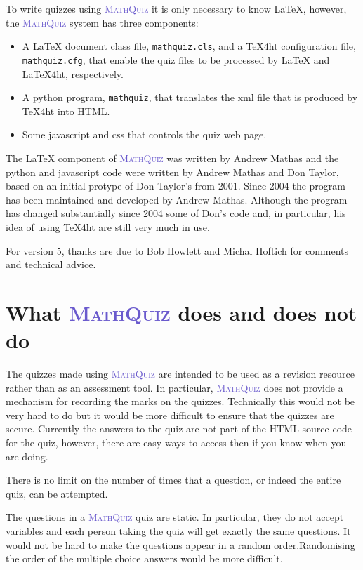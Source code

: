 \documentclass[svgnames]{article}
\def\MathQuiz{\textcolor{SlateBlue}{\textsc{MathQuiz}}\xspace}
\begin{document}
    To write quizzes using \MathQuiz it is only necessary to know
    \LaTeX, however, the \MathQuiz system has three components:
    \begin{itemize}
      \item A \LaTeX{} document class file, \texttt{mathquiz.cls}, and
      a \TeX 4ht configuration file, \texttt{mathquiz.cfg}, that enable the
      quiz files to be processed by \LaTeX{} and \LaTeX 4ht,
      respectively.
      \item A python program, \texttt{mathquiz}, that translates the xml
      file that is produced by \TeX 4ht into  HTML.
      \item Some javascript and css that controls the quiz web page.
    \end{itemize}

   The \LaTeX{} component of \MathQuiz{} was written by Andrew Mathas
   and the python and javascript code were written by Andrew Mathas and
   Don Taylor, based on an initial protype of Don Taylor's from 2001.
   Since 2004 the program has been maintained and developed by Andrew
   Mathas. Although the program has changed substantially since 2004
   some of Don's code and, in particular, his idea of using \TeX 4ht are
   still very much in use.

   For version 5, thanks are due to Bob Howlett and Michal Hoftich for
   comments and technical advice.

  \section{What \MathQuiz does and does not do}

    The quizzes made using \MathQuiz are intended to be used as a
    revision resource rather than as an assessment tool. In particular,
    \MathQuiz does not provide a mechanism for recording the marks
    on the quizzes. Technically this would not be very hard to do but it
    would be more difficult to ensure that the quizzes are secure.
    Currently the answers to the quiz are not part of the HTML source
    code for the quiz, however, there are easy ways to access then if
    you know when you are doing.

    There is no limit on the number of times that a question, or indeed
    the entire quiz, can be attempted.

    The questions in a \MathQuiz quiz are static. In particular, they do
    not accept variables and each person taking the quiz will get
    exactly the same questions. It would not be hard to make the
    questions appear in a random order.Randomising the order of the
    multiple choice answers would be more difficult.
\end{document}
